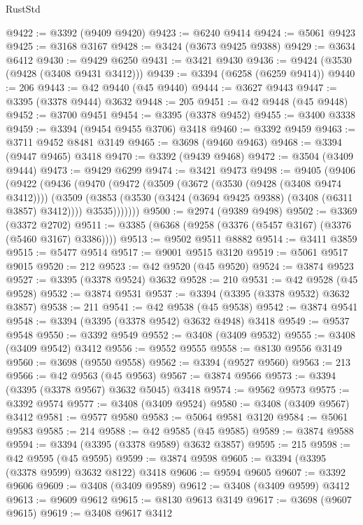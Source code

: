 \begin{lexlean}{RustStd}
\begin{coremodule}
@9422 := @3392 (@9409 @9420)
@9423 := @6240 @9414
@9424 := @5061 @9423
@9425 := @3168 @3167
@9428 := @3424 (@3673 @9425 @9388)
@9429 := @3634 @6412
@9430 := @9429 @6250
@9431 := @3421 @9430
@9436 := @9424 (@3530 (@9428 (@3408 @9431 @3412)))
@9439 := @3394 (@6258 (@6259 @9414))
@9440 := 206
@9443 := @42 @9440 (@45 @9440)
@9444 := @3627 @9443
@9447 := @3395 (@3378 @9444) @3632
@9448 := 205
@9451 := @42 @9448 (@45 @9448)
@9452 := @3700 @9451
@9454 := @3395 (@3378 @9452)
@9455 := @3400 @3338
@9459 := @3394 (@9454 @9455 @3706) @3418
@9460 := @3392 @9459
@9463 := @3711 @9452 @8481 @3149
@9465 := @3698 (@9460 @9463)
@9468 := @3394 (@9447 @9465) @3418
@9470 := @3392 (@9439 @9468)
@9472 := @3504 (@3409 @9444)
@9473 := @9429 @6299
@9474 := @3421 @9473
@9498 := @9405
    (@9406
      (@9422
        (@9436
          (@9470
            (@9472
              (@3509
                (@3672 (@3530 (@9428 (@3408 @9474 @3412))))
                (@3509
                  (@3853 (@3530 (@3424 (@3694 @9425 @9388) (@3408 (@6311 @3857) @3412))))
                  @3535)))))))
@9500 := @2974 (@9389 @9498)
@9502 := @3369 (@3372 @2702)
@9511 := @3385 (@6368 (@9258 (@3376 (@5457 @3167) (@3376 (@5460 @3167) @3386))))
@9513 := @9502 @9511 @8882
@9514 := @3411 @3859
@9515 := @5477 @9514
@9517 := @9001 @9515 @3120
@9519 := @5061 @9517 @9015
@9520 := 212
@9523 := @42 @9520 (@45 @9520)
@9524 := @3874 @9523
@9527 := @3395 (@3378 @9524) @3632
@9528 := 210
@9531 := @42 @9528 (@45 @9528)
@9532 := @3874 @9531
@9537 := @3394 (@3395 (@3378 @9532) @3632 @3857)
@9538 := 211
@9541 := @42 @9538 (@45 @9538)
@9542 := @3874 @9541
@9548 := @3394 (@3395 (@3378 @9542) @3632 @4948) @3418
@9549 := @9537 @9548
@9550 := @3392 @9549
@9552 := @3408 (@3409 @9532)
@9555 := @3408 (@3409 @9542) @3412
@9556 := @9552 @9555
@9558 := @8130 @9556 @3149
@9560 := @3698 (@9550 @9558)
@9562 := @3394 (@9527 @9560)
@9563 := 213
@9566 := @42 @9563 (@45 @9563)
@9567 := @3874 @9566
@9573 := @3394 (@3395 (@3378 @9567) @3632 @5045) @3418
@9574 := @9562 @9573
@9575 := @3392 @9574
@9577 := @3408 (@3409 @9524)
@9580 := @3408 (@3409 @9567) @3412
@9581 := @9577 @9580
@9583 := @5064 @9581 @3120
@9584 := @5061 @9583
@9585 := 214
@9588 := @42 @9585 (@45 @9585)
@9589 := @3874 @9588
@9594 := @3394 (@3395 (@3378 @9589) @3632 @3857)
@9595 := 215
@9598 := @42 @9595 (@45 @9595)
@9599 := @3874 @9598
@9605 := @3394 (@3395 (@3378 @9599) @3632 @8122) @3418
@9606 := @9594 @9605
@9607 := @3392 @9606
@9609 := @3408 (@3409 @9589)
@9612 := @3408 (@3409 @9599) @3412
@9613 := @9609 @9612
@9615 := @8130 @9613 @3149
@9617 := @3698 (@9607 @9615)
@9619 := @3408 @9617 @3412

\end{coremodule}
\end{lexlean}
